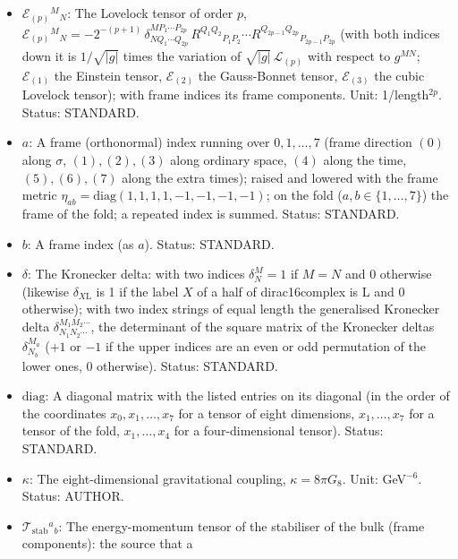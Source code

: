 \documentclass[
  10pt,
]{article}
\begin{document}
\begin{itemize}
  \(\alpha_{(p)} = w_{(p)}H^{2-2p}\) (\(\alpha_{(1)} = 1\)). Unit:
  GeV\(^{2-2p}\). Status: AUTHOR.
\item
  \(\mathcal{E}_{(p)}{}^M{}_N\): The Lovelock tensor of order \(p\),
  \(\mathcal{E}_{(p)}{}^M{}_N = -2^{-(p+1)}\,\delta^{MP_1\cdots P_{2p}}_{NQ_1\cdots Q_{2p}}\,R^{Q_1Q_2}{}_{P_1P_2}\cdots R^{Q_{2p-1}Q_{2p}}{}_{P_{2p-1}P_{2p}}\)
  (with both indices down it is \(1/\sqrt{\lvert g\rvert}\) times the
  variation of \(\sqrt{\lvert g\rvert}\,\mathcal{L}_{(p)}\) with respect
  to \(g^{MN}\); \(\mathcal{E}_{(1)}\) the Einstein tensor,
  \(\mathcal{E}_{(2)}\) the Gauss-Bonnet tensor, \(\mathcal{E}_{(3)}\)
  the cubic Lovelock tensor); with frame indices its frame components.
  Unit: 1/length\(^{2p}\). Status: STANDARD.
\item
  \(a\): A frame (orthonormal) index running over \(0, 1, \dots, 7\)
  (frame direction \((0)\) along \(\sigma\), \((1), (2), (3)\) along
  ordinary space, \((4)\) along the time, \((5), (6), (7)\) along the
  extra times); raised and lowered with the frame metric
  \(\eta_{ab} = \mathrm{diag}(1, 1, 1, 1, -1, -1, -1, -1)\); on the fold
  (\(a, b \in \{1, \dots, 7\}\)) the frame of the fold; a repeated index
  is summed. Status: STANDARD.
\item
  \(b\): A frame index (as \(a\)). Status: STANDARD.
\item
  \(\delta\): The Kronecker delta: with two indices \(\delta^M_N = 1\)
  if \(M = N\) and 0 otherwise (likewise \(\delta_{X\mathrm{L}}\) is 1
  if the label \(X\) of a half of dirac16complex is L and 0 otherwise);
  with two index strings of equal length the generalised Kronecker delta
  \(\delta^{M_1M_2\cdots}_{N_1N_2\cdots}\), the determinant of the
  square matrix of the Kronecker deltas \(\delta^{M_a}_{N_b}\) (\(+1\)
  or \(-1\) if the upper indices are an even or odd permutation of the
  lower ones, 0 otherwise). Status: STANDARD.
\item
  \(\mathrm{diag}\): A diagonal matrix with the listed entries on its
  diagonal (in the order of the coordinates \(x_0, x_1, \dots, x_7\) for
  a tensor of eight dimensions, \(x_1, \dots, x_7\) for a tensor of the
  fold, \(x_1, \dots, x_4\) for a four-dimensional tensor). Status:
  STANDARD.
\item
  \(\kappa\): The eight-dimensional gravitational coupling,
  \(\kappa = 8\pi G_8\). Unit: GeV\(^{-6}\). Status: AUTHOR.
\item
  \(\mathcal{T}_{\mathrm{stab}}{}^a{}_b\): The energy-momentum tensor of
  the stabiliser of the bulk (frame components): the source that a

\end{itemize}
\end{document}
